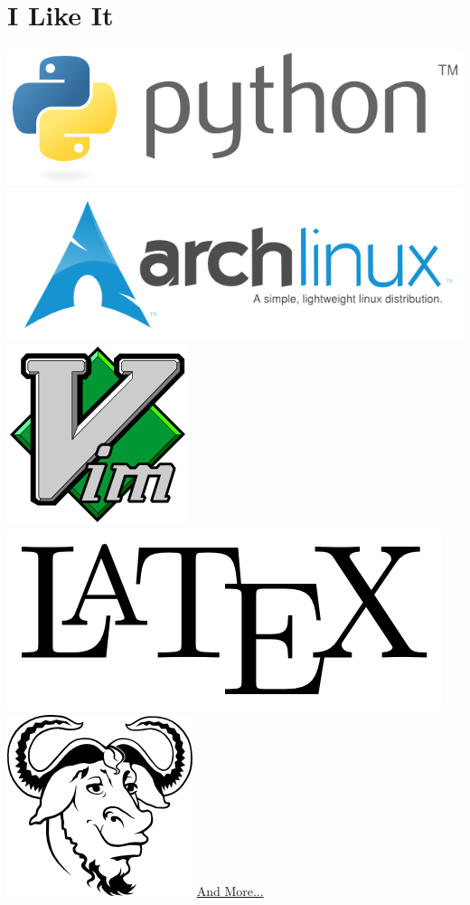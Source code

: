 \documentclass[]{friggeri-cv}
\begin{document}
\begin{aside}
~
~
~
  \section{I Like It}
    \includegraphics[scale=0.18]{img/python.png}
    \includegraphics[scale=0.18]{img/arch.png}
    \includegraphics[scale=0.06]{img/vim.png}
    \includegraphics[scale=0.06]{img/latex.png}
    \includegraphics[scale=0.08]{img/gnu.png}
    \href{http://www.system-mamba.ovh/skills/}{And More...}
    ~

\end{aside}
\end{document}
